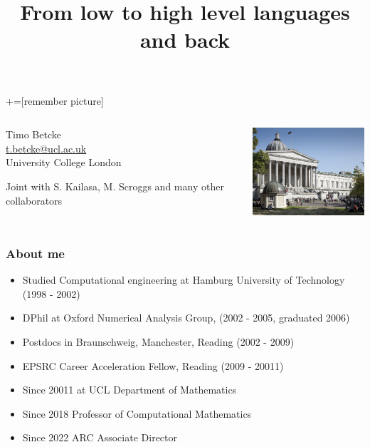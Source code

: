 \documentclass[dvipsnames,10pt]{beamer}
\title{From low to high level languages and back}
\date{}
\begin{document}
\lstset{language=Python}
+=[remember picture]
\begin{frame}

\vspace{1cm}

\titlepage
\vspace{-2cm}
\begin{columns}[T]
\begin{column}{.48\textwidth}
\begin{center}
    Timo Betcke \\
    \url{t.betcke@ucl.ac.uk}\\
    University College London
\end{center}
\begin{tcolorbox}
Joint with S. Kailasa, M. Scroggs and many
other collaborators
\end{tcolorbox}
\end{column}%
\hfill%
\begin{column}{.48\textwidth}
\includegraphics[width=5cm]{../figs/ucl_campus}

\end{column}%
\end{columns}

\end{frame}

\begin{frame}
	\frametitle{About me}
	
	\begin{itemize}
	\item Studied Computational engineering at Hamburg University of Technology (1998 - 2002)
	\item DPhil at Oxford Numerical Analysis Group, (2002 - 2005, graduated 2006)
	\item Postdocs in Braunschweig, Manchester, Reading (2002 - 2009)
	\item EPSRC Career Acceleration Fellow, Reading (2009 - 20011)
	\item Since 20011 at UCL Department of Mathematics
	\item Since 2018 Professor of Computational Mathematics
	\item Since 2022 ARC Associate Director
	\end{itemize}
	
\end{frame}
\end{document}
